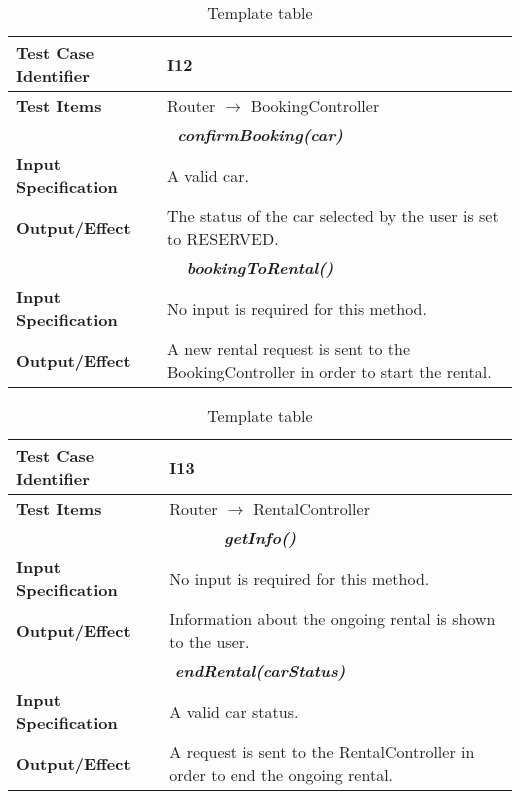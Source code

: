 \begin{table}[h]
	\begin{tabularx}{\textwidth}{l X}
		\hline
		\textbf{Test Case Identifier}	&	I12\\	\hline
		\textbf{Test Items}			&	Router $\rightarrow$ BookingController \\	\hline\hline
		\multicolumn{2}{c}{\textbf{\textit{confirmBooking(car)}}}	\\	\hline
			\textbf{Input Specification}	&	A valid car.\\	\hline
			\textbf{Output/Effect}	&	The status of the car selected by the user is set to RESERVED.\\	\hline\hline
		\multicolumn{2}{c}{\textbf{\textit{bookingToRental()}}}	\\	\hline
			\textbf{Input Specification}	&	No input is required for this method.\\	\hline
			\textbf{Output/Effect}	&	A new rental request is sent to the BookingController in order to start the rental.\\	\hline\hline
	\end{tabularx}
	\captionsetup{textformat=empty,labelformat=blank}
	\caption{Template table}
	\label{table:template-table}
\end{table}

\begin{table}[h]
	\begin{tabularx}{\textwidth}{l X}
		\hline
		\textbf{Test Case Identifier}	&	I13\\	\hline
		\textbf{Test Items}			&	Router $\rightarrow$ RentalController \\	\hline\hline
		\multicolumn{2}{c}{\textbf{\textit{getInfo()}}}	\\	\hline
			\textbf{Input Specification}	&	No input is required for this method.\\	\hline
			\textbf{Output/Effect}	&	Information about the ongoing rental is shown to the user.\\	\hline\hline
		\multicolumn{2}{c}{\textbf{\textit{endRental(carStatus)}}}	\\	\hline
			\textbf{Input Specification}	&	A valid car status.\\	\hline
			\textbf{Output/Effect}	&	A request is sent to the RentalController in order to end the ongoing rental.\\	\hline\hline
	\end{tabularx}
	\captionsetup{textformat=empty,labelformat=blank}
	\caption{Template table}
	\label{table:template-table}
\end{table}

